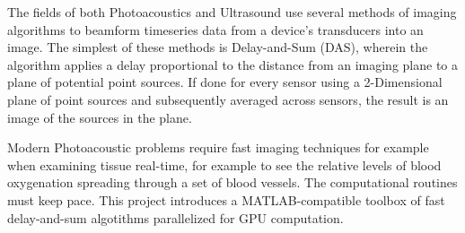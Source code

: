 The fields of both Photoacoustics and Ultrasound use several methods of imaging algorithms to beamform timeseries data from a device's transducers into an image. The simplest of these methods is Delay-and-Sum (DAS), wherein the algorithm applies a delay proportional to the distance from an imaging plane to a plane of potential point sources. If done for every sensor using a 2-Dimensional plane of point sources and subsequently averaged across sensors, the result is an image of the sources in the plane.

Modern Photoacoustic problems require fast imaging techniques for example when examining tissue real-time, for example to see the relative levels of blood oxygenation spreading through a set of blood vessels. The computational routines must keep pace. This project introduces a MATLAB-compatible toolbox of fast delay-and-sum algotithms parallelized for GPU computation.